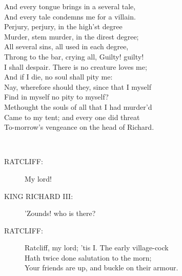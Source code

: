 \documentclass{article}
\begin{document}
\begin{description}
\hspace{1pt}And every tongue brings in a several tale,\\
\hspace{1pt}And every tale condemns me for a villain.\\
\hspace{1pt}Perjury, perjury, in the high'st degree\\
\hspace{1pt}Murder, stem murder, in the direst degree;\\
\hspace{1pt}All several sins, all used in each degree,\\
\hspace{1pt}Throng to the bar, crying all, Guilty! guilty!\\
\hspace{1pt}I shall despair. There is no creature loves me;\\
\hspace{1pt}And if I die, no soul shall pity me:\\
\hspace{1pt}Nay, wherefore should they, since that I myself\\
\hspace{1pt}Find in myself no pity to myself?\\
\hspace{1pt}Methought the souls of all that I had murder'd\\
\hspace{1pt}Came to my tent; and every one did threat\\
\hspace{1pt}To-morrow's vengeance on the head of Richard.\\
\end{description}
\\
\begin{description}
\item[RATCLIFF:] 
\hspace{1pt}My lord!\\
\end{description}
\begin{description}
\item[KING RICHARD III:] 
\hspace{1pt}'Zounds! who is there?\\
\end{description}
\begin{description}
\item[RATCLIFF:] 
\hspace{1pt}Ratcliff, my lord; 'tis I. The early village-cock\\
\hspace{1pt}Hath twice done salutation to the morn;\\
\hspace{1pt}Your friends are up, and buckle on their armour.\\
\end{description}
\end{document}
